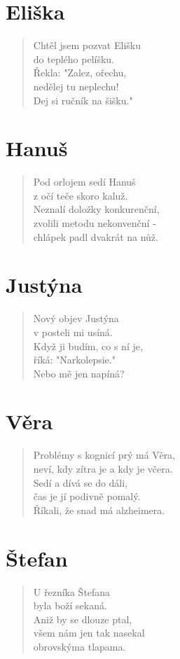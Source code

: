 \section*{Eliška}
\begin{verse}
Chtěl jsem pozvat Elišku\\
do teplého pelíšku.\\
Řekla: "Zalez, ořechu,\\
nedělej tu neplechu!\\
Dej si ručník na šišku."
\end{verse}

\section*{Hanuš}
\begin{verse}
Pod orlojem sedí Hanuš\\
z očí teče skoro kaluž.\\
Neznalí doložky konkurenční,\\
zvolili metodu nekonvenční -\\
chlápek padl dvakrát na nůž.
\end{verse}

\section*{Justýna}
\begin{verse}
Nový objev Justýna\\
v posteli mi usíná.\\
Když ji budím, co s ní je,\\
říká: "Narkolepsie."\\
Nebo mě jen napíná?
\end{verse}

\section*{Věra}
\begin{verse}
Problémy s kognicí prý má Věra,\\
neví, kdy zítra je a kdy je včera.\\
Sedí a dívá se do dáli,\\
čas je jí podivně pomalý.\\
Říkali, že snad má alzheimera.
\end{verse}

\section*{Štefan}
\begin{verse}
U řezníka Štefana\\
byla boží sekaná.\\
Aniž by se dlouze ptal,\\
všem nám jen tak nasekal\\
obrovskýma tlapama.
\end{verse}

